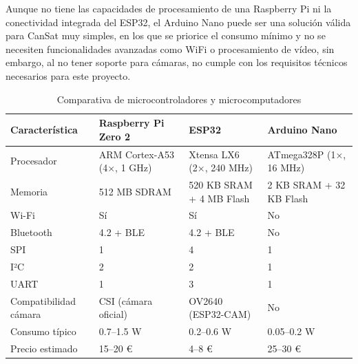 \begin{itemize}
    Aunque no tiene las capacidades de procesamiento de una Raspberry Pi ni la conectividad integrada del ESP32, el Arduino Nano puede ser una solución válida para CanSat muy simples,
    en los que se priorice el consumo mínimo y no se necesiten funcionalidades avanzadas como WiFi o procesamiento de vídeo, sin embargo, al no tener soporte para cámaras,
    no cumple con los requisitos técnicos necesarios para este proyecto.

\end{itemize}

\begin{table}[h]
    \centering
    \footnotesize
    \begin{tabular}{|l|l|l|l|}
        \hline
        \textbf{Característica} & \textbf{Raspberry Pi Zero 2} & \textbf{ESP32}           & \textbf{Arduino Nano}   \\
        \hline
        Procesador              & ARM Cortex-A53 (4×, 1 GHz)   & Xtensa LX6 (2×, 240 MHz) & ATmega328P (1×, 16 MHz) \\
        \hline
        Memoria                 & 512 MB SDRAM                 & 520 KB SRAM + 4 MB Flash & 2 KB SRAM + 32 KB Flash \\
        \hline
        Wi-Fi                   & Sí                           & Sí                       & No                      \\
        \hline
        Bluetooth               & 4.2 + BLE                    & 4.2 + BLE                & No                      \\
        \hline
        SPI                     & 1                            & 4                        & 1                       \\
        \hline
        I²C                     & 2                            & 2                        & 1                       \\
        \hline
        UART                    & 1                            & 3                        & 1                       \\
        \hline
        Compatibilidad cámara   & CSI (cámara oficial)         & OV2640 (ESP32-CAM)       & No                      \\
        \hline
        Consumo típico          & 0.7--1.5 W                   & 0.2--0.6 W               & 0.05--0.2 W             \\
        \hline
        Precio estimado         & 15--20 €                     & 4--8 €                   & 25--30 €                \\
        \hline
    \end{tabular}
    \caption{Comparativa de microcontroladores y microcomputadores}
    \label{tab:comparativa-mcus}
\end{table}


